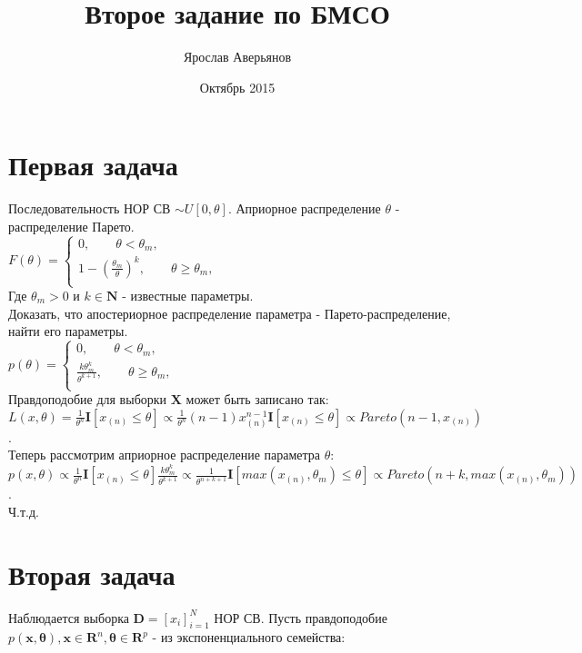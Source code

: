 \documentclass{article}
\title{Второе задание по БМСО}
\author{Ярослав Аверьянов}
\date{Октябрь 2015}
\begin{document}
\maketitle

\section{Первая задача}
Последовательность НОР СВ $\sim U[0,\theta]$. Априорное распределение $\theta$ - распределение Парето.\\
$
F(\theta)=
\begin{cases}
0, \qquad \theta < \theta_m, \\
1 - (\frac{\theta_m}{\theta})^k, \qquad \theta \geq \theta_m , \\
\end{cases}
$\\  
Где $\theta_m > 0$ и $k \in \mathbf{N}$ - известные параметры.\\
Доказать, что апостериорное распределение параметра - Парето-распределение, найти его параметры.\\
$
p(\theta)=
\begin{cases}
0, \qquad \theta < \theta_m, \\
\frac{k\theta_m^k}{\theta^{k+1}}, \qquad \theta \geq \theta_m , \\
\end{cases}
$\\
Правдоподобие для выборки $\mathbf{X}$ может быть записано так:\\
$L(x,\theta) = \frac{1}{\theta^n}\mathbf{I}[x_{(n)} \leq \theta] \propto \frac{1}{\theta^n}(n-1)x_{(n)}^{n-1}\mathbf{I}[x_{(n)} \leq \theta] \propto Pareto(n-1,x_{(n)})$.\\
Теперь рассмотрим априорное распределение параметра $\theta$:\\
$p(x,\theta) \propto \frac{1}{\theta^n}\mathbf{I}[x_{(n)} \leq \theta]\frac{k\theta_m^k}{\theta^{k+1}} \propto \frac{1}{\theta^{n+k+1}}\mathbf{I}[max(x_{(n)}, \theta_m) \leq \theta] \propto Pareto(n+k, max(x_{(n)}, \theta_m))$.\\
Ч.т.д. 

\section{Вторая задача}
Наблюдается выборка $\mathbf{D} = [x_i]_{i = 1}^{N}$ НОР СВ. Пусть правдоподобие $p(\mathbf{x},\boldsymbol{\theta}), \mathbf{x} \in \mathbf{R}^n, \boldsymbol{\theta} \in \mathbf{R}^p$ - из экспоненциального семейства:\\
\end{document}
